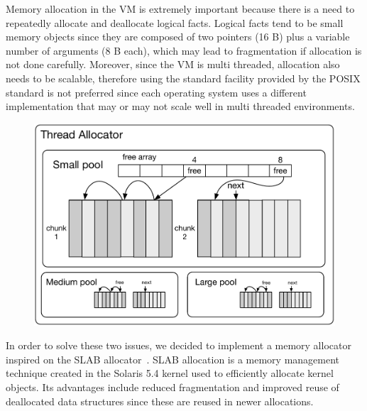 
Memory allocation in the VM is extremely important because there is a need to
repeatedly allocate and deallocate logical facts. Logical facts tend to be small
memory objects since they are composed of two pointers (16 B) plus a variable
number of arguments (8 B each), which may lead to fragmentation if allocation is
not done carefully.  Moreover, since the VM is multi threaded, allocation also
needs to be scalable, therefore using the standard  facility
provided by the POSIX standard is not preferred since each operating system uses
a different implementation that may or may not scale well in multi threaded
environments.

\begin{figure}[ht]
   \begin{center}
      \includegraphics[width=0.7\linewidth]{figures/implementation/pool.pdf}
   \end{center}


   \label{fig:implementation:pool}
\end{figure}

In order to solve these two issues, we decided to implement a memory allocator
inspired on the SLAB allocator~\cite{Bonwick-94}. SLAB allocation is a memory
management technique created in the Solaris 5.4 kernel used to efficiently
allocate kernel objects. Its advantages include reduced fragmentation and
improved reuse of deallocated data structures since these are reused in newer
allocations.

